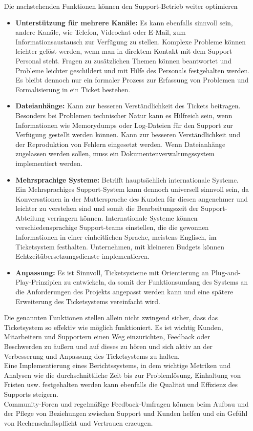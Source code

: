 Die nachstehenden Funktionen können den Support-Betrieb weiter optimieren
\begin{itemize}
	\item \textbf{Unterstützung für mehrere Kanäle:} Es kann ebenfalls sinnvoll sein, andere Kanäle, wie Telefon, Videochat oder E-Mail, zum Informationsaustausch zur Verfügung zu stellen. Komplexe Probleme können leichter gelöst werden, wenn man in direktem Kontakt mit dem Support-Personal steht. Fragen zu zusätzlichen Themen können beantwortet und Probleme leichter geschildert und mit Hilfe des Personals festgehalten werden. Es bleibt dennoch nur ein formaler Prozess zur Erfassung von Problemen und Formalisierung in ein Ticket bestehen.
	\item \textbf{Dateianhänge:} Kann zur besseren Verständlichkeit des Tickets beitragen. Besonders bei Problemen technischer Natur kann es Hilfreich sein, wenn Informationen wie Memorydumps oder Log-Dateien für den Support zur Verfügung gestellt werden können. Kann zur besseren Verständlichkeit und der Reproduktion von Fehlern eingesetzt werden. Wenn Dateianhänge zugelassen werden sollen, muss ein Dokumentenverwaltungssystem implementiert werden.
	\item \textbf{Mehrsprachige Systeme:} Betrifft hauptsächlich internationale Systeme. Ein Mehrsprachiges Support-System kann dennoch universell sinnvoll sein, da Konversationen in der Muttersprache des Kunden für diesen angenehmer und leichter zu verstehen sind und somit die Bearbeitungszeit der Support-Abteilung verringern können. Internationale Systeme können verschiedensprachige Support-teams einstellen, die die gewonnen Informationen in einer einheitlichen Sprache, meistens Englisch, im Ticketsystem festhalten. Unternehmen, mit kleineren Budgets können Echtzeitübersetzungsdienste implementieren.
	\item \textbf{Anpassung:} Es ist Sinnvoll, Ticketsysteme mit Orientierung an Plug-and-Play-Prinzipien zu entwickeln, da somit der Funktionsumfang des Systems an die Anforderungen des Projekts angepasst werden kann und eine spätere Erweiterung des Ticketsystems vereinfacht wird.
\end{itemize}  
Die genannten Funktionen stellen allein nicht zwingend sicher, dass das Ticketsystem so effektiv wie möglich funktioniert. Es ist wichtig Kunden, Mitarbeitern und Supportern einen Weg einzurichten, Feedback oder Beschwerden zu äußern und auf dieses zu hören und sich aktiv an der Verbesserung und Anpassung des Ticketsystems zu halten. \\
Eine Implementierung eines Berichtssystems, in dem wichtige Metriken und Analysen wie die durchschnittliche Zeit bis zur Problemlösung, Einhaltung von Fristen usw. festgehalten werden kann ebenfalls die Qualität und Effizienz des Supports steigern. \\
Community-Foren und regelmäßige Feedback-Umfragen können beim Aufbau und der Pflege von Beziehungen zwischen Support und Kunden helfen und ein Gefühl von Rechenschaftspflicht und Vertrauen erzeugen.
